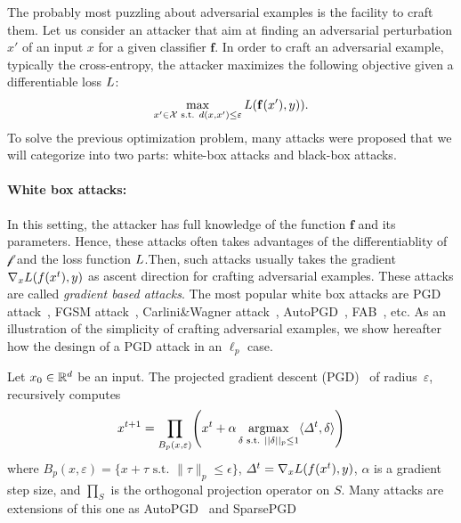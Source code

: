 The probably most puzzling about adversarial examples is the facility to craft them. Let us consider an attacker that aim at finding an adversarial perturbation $x'$ of an input $x$ for a given classifier $\mathbf{f}$.  In order to craft an adversarial example, typically the cross-entropy, the attacker maximizes the following objective given a differentiable loss $L$:
\begin{align}
    \max_{x'\in\XX\text{ s.t. } d(x,x')\leq \varepsilon}\loss\left(\mathbf{f}(x'), y)\right).
\end{align}
To solve the previous optimization problem, many attacks were proposed that we will categorize into two parts: white-box attacks and black-box attacks.
\paragraph{White box attacks:} In this setting, the attacker has  full knowledge of the function $\mathbf{f}$ and its parameters. Hence, these attacks often takes advantages of the differentiablity of $\mathcal{f}$ and the loss function $L$.Then, such attacks usually takes the gradient $\nabla_x \loss\left(f\left(x^t\right),y\right)$ as ascent direction for crafting adversarial examples.  These attacks are called \emph{gradient based attacks}. The most popular white box attacks are PGD attack~\cite{kurakin2016adversarial,madry2017towards}, FGSM attack~\citep{goodfellow2014explaining}, Carlini\&Wagner attack~\citep{carlini2017towards}, AutoPGD~\citep{Croce2020MinimallyDA}, FAB~\citep{Croce2020MinimallyDA}, etc. As an illustration of the simplicity of crafting adversarial examples, we show hereafter how the desingn of a PGD attack in an $\ell_p$ case.
\begin{example*} Let $x_0\in\mathbb{R}^d$ be an input. The projected gradient descent (PGD)~\cite{kurakin2016adversarial,madry2017towards} of radius~$\varepsilon$, recursively computes
\begin{align*}
x^{t+1}=\prod_{B_p(x,\varepsilon)}\left(x^t
+\alpha \argmaxB_{\delta\text{ s.t. }||\delta||_p\leq1} \langle\Delta^t,\delta \rangle\right)
\end{align*}
where $B_p(x,\varepsilon) = \{ x+\tau \text{~s.t.~} \lVert\tau\rVert_p \leq \epsilon\}$, $\Delta^t=\nabla_x \loss\left(f\left(x^t\right),y\right)$, $\alpha$ is a gradient step size, and $\prod_S$ is the orthogonal projection operator on $S$. Many attacks are extensions of this one as AutoPGD~\citep{Croce2020ReliableEO} and SparsePGD~\citep{tramer2019adversarial}
\end{example*}
